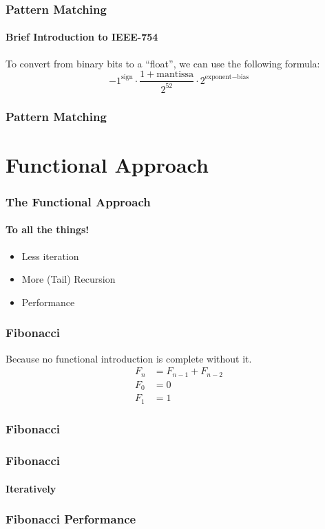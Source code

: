 \documentclass[english]{beamer}
\begin{document}
\begin{frame}
\frametitle{Pattern Matching}
\framesubtitle{Brief Introduction to IEEE-754}
To convert from binary bits to a ``float'', we can use the following formula:
$$
{-1}^{\text{sign}} \cdot{}
\frac{1 + \text{mantissa}}{2^{52}}
\cdot{} 2^{\text{exponent} - \text{bias}}
$$
\end{frame}

\begin{frame}[fragile]
\frametitle{Pattern Matching}

\end{frame}

\section{Functional Approach}

\begin{frame}
\frametitle{The Functional Approach}
\framesubtitle{To all the things!}
\begin{itemize}
\item{Less iteration} %
\item{More (Tail) Recursion} %
\item{Performance}
\end{itemize}
\end{frame}

\begin{frame}
\frametitle{Fibonacci}
Because no functional introduction is complete without it.
\begin{align*}
F_n &= F_{n-1} + F_{n-2} \\
F_0 &= 0 \\
F_1 &= 1
\end{align*}
\end{frame}

\begin{frame}[fragile]
\frametitle{Fibonacci}

\end{frame}

\begin{frame}[fragile]
\frametitle{Fibonacci}
\framesubtitle{Iteratively}

\end{frame}

\begin{frame}[fragile]
\frametitle{Fibonacci Performance}

\end{frame}
\end{document}
